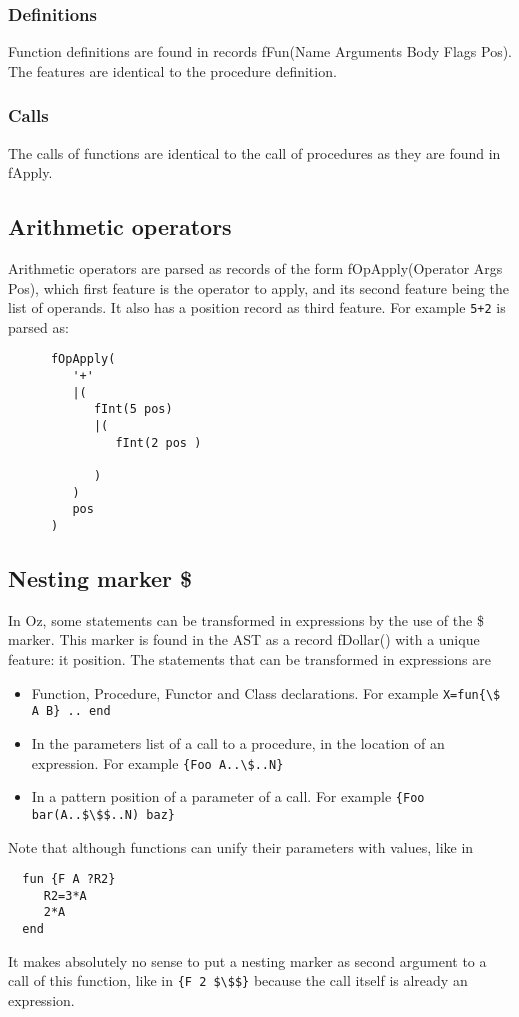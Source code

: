 \documentclass[a4paper]{memoir}
\begin{document}
\subsubsection{Definitions}
Function definitions are found in records fFun(Name Arguments Body Flags Pos). The features are identical to the procedure definition.
\subsubsection{Calls}
The calls of functions are identical to the call of procedures as they are found in fApply.
\subsection{Arithmetic operators}\label{sec:input:operators}
Arithmetic operators are parsed as records of the form fOpApply(Operator Args Pos), which first feature is the operator to apply, and its second feature being the list of operands. It also has a position record as third feature. For example
\lstinline!5+2! is parsed as:
\begin{lstlisting}
      fOpApply(
         '+'
         |(
            fInt(5 pos)
            |(
               fInt(2 pos )
               
            )
         )
         pos
      )

\end{lstlisting}
\subsection{Nesting marker \$}\label{sec:input:nestingmarker}
In Oz, some statements can be transformed in expressions by the use of the \$ marker. This marker is found in the AST as a record fDollar() with a unique feature: it position.
The statements that can be transformed in expressions are
\begin{itemize}
  \item Function, Procedure, Functor and Class declarations. For example
    \lstinline!X=fun{\$ A B} .. end!
  \item In the parameters list of a call to a procedure, in the location of an
    expression. For example \lstinline!{Foo A..\$..N}!
  \item In a pattern position of a parameter of a call. For example
    \lstinline[mathescape]!{Foo bar(A..$\$$..N) baz}!
\end{itemize}
Note that although functions can unify their parameters with values, like in 
\begin{lstlisting}
  fun {F A ?R2}
     R2=3*A
     2*A
  end
\end{lstlisting}
It makes absolutely no sense to put a nesting marker as second argument to a call of this function, like in 
\lstinline[mathescape]!{F 2 $\$$}! because the call itself is already an expression.
\end{document}
